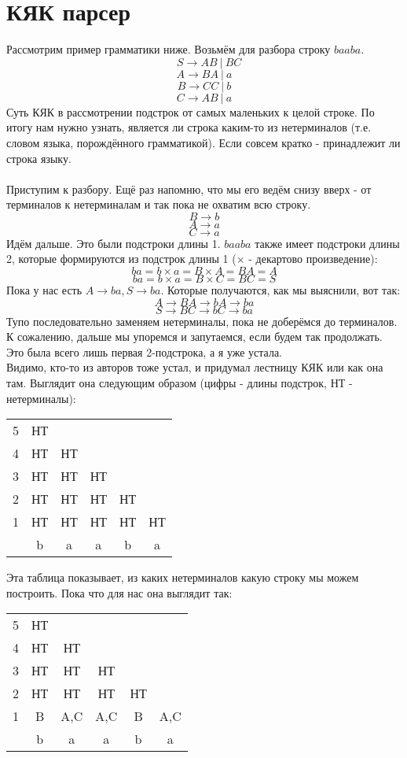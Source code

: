 \documentclass{article}
\begin{document}
\part{КЯК парсер}
Рассмотрим пример грамматики ниже. Возьмём для разбора строку $baaba$.
$$\ \ \ \ S \to AB \ | \ BC $$
$$A \to BA \ | \ a $$
$$B \to CC \ | \ b $$
$$C \to AB \ | \ a $$
Суть КЯК в рассмотрении подстрок от самых маленьких к целой строке. 
По итогу нам нужно узнать, является ли строка каким-то из нетерминалов 
(т.е. словом языка, порождённого грамматикой). Если совсем кратко -
принадлежит ли строка языку.
\\\\
Приступим к разбору. Ещё раз напомню, что мы его ведём снизу вверх - 
от терминалов к нетерминалам и так пока не охватим всю строку.
$$B \to b$$
$$A \to a$$
$$C \to a$$
Идём дальше. Это были подстроки длины 1. $baaba$ также имеет подстроки длины 2,
которые формируются из подстрок длины 1 ($\times$ - декартово произведение):
$$ba = b\times a = B \times A = BA = A$$
$$ba = b\times a = B \times C = BC = S$$
Пока у нас есть $A \to ba, S \to ba$. 
Которые получаются, как мы выяснили, вот так:
$$ A \to BA \to bA \to ba$$
$$ S \to BC \to bC \to ba$$
Тупо последовательно заменяем нетерминалы, пока не доберёмся до терминалов.
К сожалению, дальше мы упоремся и запутаемся, если будем так продолжать. 
Это была всего лишь первая 2-подстрока, а я уже устала.\\
Видимо, кто-то из авторов тоже устал, и придумал лестницу КЯК или как она там. 
Выглядит она следующим образом (цифры - длины подстрок, НТ - нетерминалы):\\
\begin{center}
    \begin{tabular}{ c|c c c c c }
    5 & НТ \\ 
    4 & НТ & НТ  \\  
    3 & НТ & НТ & НТ   \\  
    2 & НТ & НТ & НТ & НТ  \\  
    1 & НТ & НТ & НТ & НТ & НТ  \\
    \hline
      & b  &  a &  a & b  &  a 
    \end{tabular}
\end{center}
Эта таблица показывает, из каких нетерминалов какую строку мы можем построить.
Пока что для нас она выглядит так:
\begin{center}
    \begin{tabular}{ c|c c c c c }
    5 & НТ  \\ 
    4 & НТ & НТ   \\  
    3 & НТ & НТ & НТ   \\  
    2 & НТ & НТ & НТ & НТ  \\  
    1 & B & A,C & A,C & B & A,C  \\
    \hline
      & b  &  a &  a & b  &  a 
    \end{tabular}
\end{center}
\end{document}
